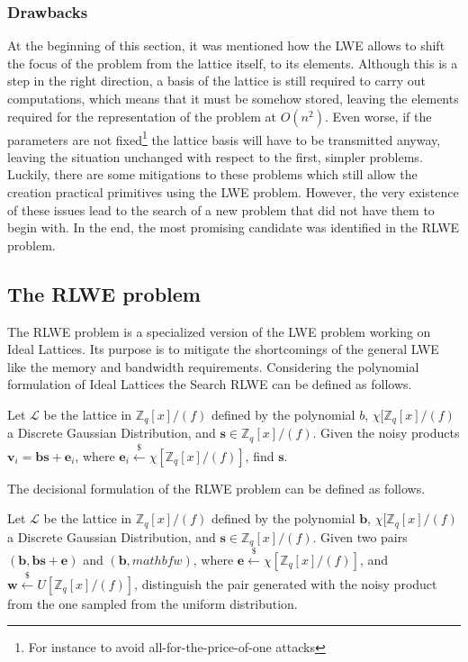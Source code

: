 \subsubsection{Drawbacks}
At the beginning of this section, it was mentioned how the LWE allows to shift the focus of the problem from the lattice itself, to its elements. Although this is a step in the right direction, a basis of the lattice is still required to carry out computations, which means that it must be somehow stored, leaving the elements required for the representation of the problem at $O(n^2)$. Even worse, if the parameters are not fixed\footnote{For instance to avoid all-for-the-price-of-one attacks} the lattice basis will have to be transmitted anyway, leaving the situation unchanged with respect to the first, simpler problems.\\
Luckily, there are some mitigations to these problems which still allow the creation practical primitives using the LWE problem. However, the very existence of these issues lead to the search of a new problem that did not have them to begin with. In the end, the most promising candidate was identified in the RLWE problem.

\subsection{The RLWE problem}
The RLWE problem is a specialized version of the LWE problem working on Ideal Lattices. Its purpose is to mitigate the shortcomings of the general LWE like the memory and bandwidth requirements. Considering the polynomial formulation of Ideal Lattices the Search RLWE can be defined as follows.

\begin{definition}
Let $\mathscr{L}$ be the lattice in $\mathbb{Z}_q[x]/(f)$ defined by the polynomial $b$, $\chi[\mathbb{Z}_q[x]/(f)$ a Discrete Gaussian Distribution, and $\mathbf{s}\in\mathbb{Z}_q[x]/(f)$. Given the noisy products $\mathbf{v}_i=\mathbf{bs} + \mathbf{e}_i$, where $\mathbf{e}_i\xleftarrow{\$}\chi[\mathbb{Z}_q[x]/(f)]$, find $\mathbf{s}$.
\end{definition}

The decisional formulation of the RLWE problem can be defined as follows.

\begin{definition}
\sloppy Let $\mathscr{L}$ be the lattice in $\mathbb{Z}_q[x]/(f)$ defined by the polynomial $\mathbf{b}$, $\chi[\mathbb{Z}_q[x]/(f)$ a Discrete Gaussian Distribution, and \mbox{$\mathbf{s}\in\mathbb{Z}_q[x]/(f)$}. Given two pairs $(\mathbf{b},\mathbf{bs} + \mathbf{e})$ and $(\mathbf{b},mathbf{w})$, where \mbox{$\mathbf{e}\xleftarrow{\$}\chi[\mathbb{Z}_q[x]/(f)]$}, and \mbox{$\mathbf{w}\xleftarrow{\$}U[\mathbb{Z}_q[x]/(f)]$}, distinguish the pair generated with the noisy product from the one sampled from the uniform distribution. 
\end{definition}

